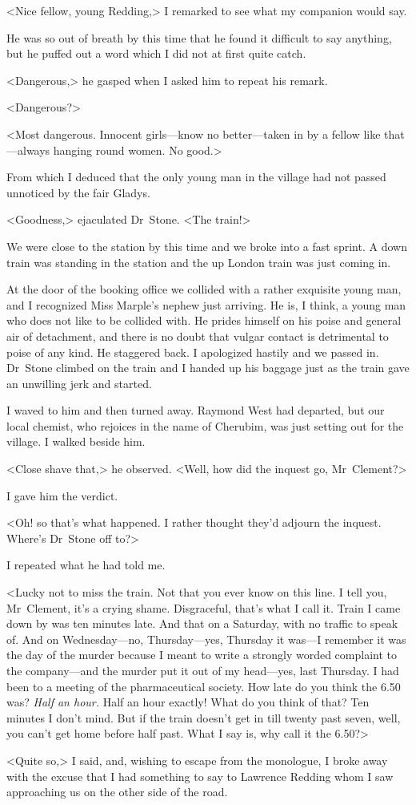 <Nice fellow, young Redding,> I remarked to see what my companion would say.

He was so out of breath by this time that he found it difficult to say anything, but he puffed out a word which I did not at first quite catch.

<Dangerous,> he gasped when I asked him to repeat his remark.

<Dangerous?>

<Most dangerous. Innocent girls—know no better—taken in by a fellow like that—always hanging round women. No good.>

From which I deduced that the only young man in the village had not passed unnoticed by the fair Gladys.

<Goodness,> ejaculated Dr~Stone. <The train!>

We were close to the station by this time and we broke into a fast sprint. A down train was standing in the station and the up London train was just coming in.

At the door of the booking office we collided with a rather exquisite young man, and I recognized Miss Marple's nephew just arriving. He is, I think, a young man who does not like to be collided with. He prides himself on his poise and general air of detachment, and there is no doubt that vulgar contact is detrimental to poise of any kind. He staggered back. I apologized hastily and we passed in. Dr~Stone climbed on the train and I handed up his baggage just as the train gave an unwilling jerk and started.

I waved to him and then turned away. Raymond West had departed, but our local chemist, who rejoices in the name of Cherubim, was just setting out for the village. I walked beside him.

<Close shave that,> he observed. <Well, how did the inquest go, Mr~Clement?>

I gave him the verdict.

<Oh! so that's what happened. I rather thought they'd adjourn the inquest. Where's Dr~Stone off to?>

I repeated what he had told me.

<Lucky not to miss the train. Not that you ever know on this line. I tell you, Mr~Clement, it's a crying shame. Disgraceful, that's what I call it. Train I came down by was ten minutes late. And that on a Saturday, with no traffic to speak of. And on Wednesday—no, Thursday—yes, Thursday it was—I remember it was the day of the murder because I meant to write a strongly worded complaint to the company—and the murder put it out of my head—yes, last Thursday. I had been to a meeting of the pharmaceutical society. How late do you think the 6.50 was? \emph{Half an hour.} Half an hour exactly! What do you think of that? Ten minutes I don't mind. But if the train doesn't get in till twenty past seven, well, you can't get home before half past. What I say is, why call it the 6.50?>

<Quite so,> I said, and, wishing to escape from the monologue, I broke away with the excuse that I had something to say to Lawrence Redding whom I saw approaching us on the other side of the road.